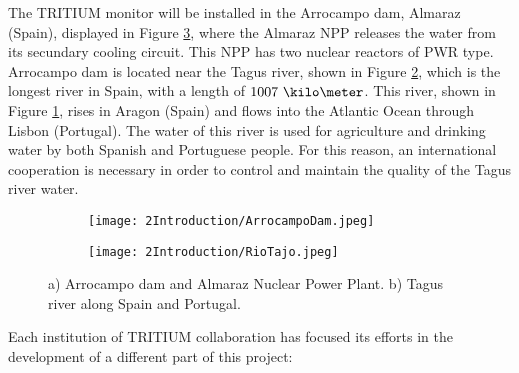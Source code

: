 The TRITIUM monitor will be installed in the Arrocampo dam, Almaraz (Spain), displayed in Figure \ref{fig:Arrocampo}, where the Almaraz NPP releases the water from its secundary cooling circuit. This NPP has two nuclear reactors of PWR type. Arrocampo dam is located near the Tagus river, shown in Figure \ref{subfig:TajusRiver}, which is the longest river in Spain, with a length of $1007~\kilo\meter$. This river, shown in Figure \ref{subfig:Arrocampo_Dam}, rises in Aragon (Spain) and flows into the Atlantic Ocean through Lisbon (Portugal). The water of this river is used for agriculture and drinking water by both Spanish and Portuguese people. For this reason, an international cooperation is necessary in order to control and maintain the quality of the Tagus river water.

\begin{figure}
\centering
    \begin{subfigure}[b]{0.45\textwidth}
    \centering
    \texttt{[image: 2Introduction/ArrocampoDam.jpeg]}  
    \caption{\label{subfig:Arrocampo_Dam}}
    \end{subfigure}
    \hfill
    \begin{subfigure}[b]{0.45\textwidth}
    \centering
    \texttt{[image: 2Introduction/RioTajo.jpeg]}  
    \caption{\label{subfig:TajusRiver}}
    \end{subfigure}
 \caption{a) Arrocampo dam and Almaraz Nuclear Power Plant. b) Tagus river along Spain and Portugal.}
 \label{fig:Arrocampo}
\end{figure}

Each institution of TRITIUM collaboration has focused its efforts in the development of a different part of this project:

